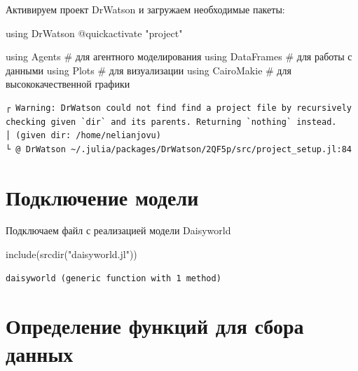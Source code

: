 \documentclass[
  12pt,
  a4paper,
  DIV=11,
  numbers=noendperiod]{scrreprt}
\newenvironment{Shaded}{\begin{snugshade}}{\end{snugshade}}
\newcommand{\BuiltInTok}[1]{\textcolor[rgb]{0.00,0.23,0.31}{#1}}
\newcommand{\CommentTok}[1]{\textcolor[rgb]{0.37,0.37,0.37}{#1}}
\newcommand{\FunctionTok}[1]{\textcolor[rgb]{0.28,0.35,0.67}{#1}}
\newcommand{\ImportTok}[1]{\textcolor[rgb]{0.00,0.46,0.62}{#1}}
\newcommand{\NormalTok}[1]{\textcolor[rgb]{0.00,0.23,0.31}{#1}}
\newcommand{\PreprocessorTok}[1]{\textcolor[rgb]{0.68,0.00,0.00}{#1}}
\newcommand{\StringTok}[1]{\textcolor[rgb]{0.13,0.47,0.30}{#1}}
\begin{document}
Активируем проект DrWatson и загружаем необходимые пакеты:

\begin{Shaded}
\begin{Highlighting}[]
\ImportTok{using} \BuiltInTok{DrWatson}
\PreprocessorTok{@quickactivate} \StringTok{"project"}

\ImportTok{using} \BuiltInTok{Agents}      \CommentTok{\# для агентного моделирования}
\ImportTok{using} \BuiltInTok{DataFrames}  \CommentTok{\# для работы с данными}
\ImportTok{using} \BuiltInTok{Plots}       \CommentTok{\# для визуализации}
\ImportTok{using} \BuiltInTok{CairoMakie}  \CommentTok{\# для высококачественной графики}
\end{Highlighting}
\end{Shaded}

\begin{verbatim}
┌ Warning: DrWatson could not find find a project file by recursively checking given `dir` and its parents. Returning `nothing` instead.
│ (given dir: /home/nelianjovu)
└ @ DrWatson ~/.julia/packages/DrWatson/2QF5p/src/project_setup.jl:84
\end{verbatim}

\section{Подключение
модели}\label{ux43fux43eux434ux43aux43bux44eux447ux435ux43dux438ux435-ux43cux43eux434ux435ux43bux438-5}

Подключаем файл с реализацией модели Daisyworld

\begin{Shaded}
\begin{Highlighting}[]
\FunctionTok{include}\NormalTok{(}\FunctionTok{srcdir}\NormalTok{(}\StringTok{"daisyworld.jl"}\NormalTok{))}
\end{Highlighting}
\end{Shaded}

\begin{verbatim}
daisyworld (generic function with 1 method)
\end{verbatim}

\section{Определение функций для сбора
данных}\label{ux43eux43fux440ux435ux434ux435ux43bux435ux43dux438ux435-ux444ux443ux43dux43aux446ux438ux439-ux434ux43bux44f-ux441ux431ux43eux440ux430-ux434ux430ux43dux43dux44bux445-3}
\end{document}
